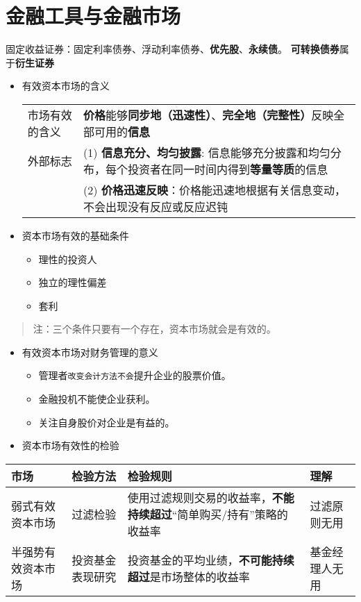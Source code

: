 \documentclass[12pt,a4paper]{article}
\begin{document}
\section{金融工具与金融市场}
\label{sec:org6ec551b}
固定收益证券：固定利率债券、浮动利率债券、\textbf{优先股}、\textbf{永续债}。
\textbf{可转换债券}属于\textbf{衍生证券}
\begin{itemize}
\item 有效资本市场的含义
\begin{center}
\begin{tabular}{ll}
市场有效的含义 & \textbf{价格}能够\textbf{同步地（迅速性）}、\textbf{完全地（完整性）}反映全部可用的\textbf{信息}\\
外部标志 & (1) \textbf{信息充分、均匀披露}: 信息能够充分披露和均匀分布，每个投资者在同一时间内得到\textbf{等量等质}的信息\\
 & (2) \textbf{价格迅速反映}：价格能迅速地根据有关信息变动，不会出现没有反应或反应迟钝\\
\end{tabular}
\end{center}
\item 资本市场有效的基础条件
\begin{itemize}
\item 理性的投资人
\item 独立的理性偏差
\item 套利
\end{itemize}
\end{itemize}
\begin{quote}
注：三个条件只要有一个存在，资本市场就会是有效的。
\end{quote}
\begin{itemize}
\item 有效资本市场对财务管理的意义
\begin{itemize}
\item 管理者\texttt{改变会计方法不会}提升企业的股票价值。
\item 金融投机不能使企业获利。
\item 关注自身股价对企业是有益的。
\end{itemize}
\item 资本市场有效性的检验
\end{itemize}
\begin{center}
\begin{tabular}{llll}
市场 & 检验方法 & 检验规则 & 理解\\
\hline
弱式有效资本市场 & 过滤检验 & 使用过滤规则交易的收益率，\textbf{不能持续超过}``简单购买/持有''策略的收益率 & 过滤原则无用\\
\hline
半强势有效资本市场 & 投资基金表现研究 & 投资基金的平均业绩，\textbf{不可能持续超过}是市场整体的收益率 & 基金经理人无用\\
\end{tabular}
\end{center}
\end{document}
